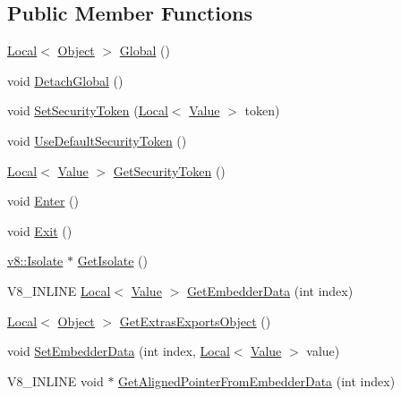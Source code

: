 \subsection*{Public Member Functions}
\begin{DoxyCompactItemize}
\item 
\hyperlink{classv8_1_1Local}{Local}$<$ \hyperlink{classv8_1_1Object}{Object} $>$ \hyperlink{classv8_1_1Context_af5cd9f97ef6a3307c1c21f80f4b743eb}{Global} ()
\item 
void \hyperlink{classv8_1_1Context_a841c7dd92eb8c57df92a268a164dea97}{Detach\+Global} ()
\item 
void \hyperlink{classv8_1_1Context_a2351d9bdf4450d5f23734033289ba3ab}{Set\+Security\+Token} (\hyperlink{classv8_1_1Local}{Local}$<$ \hyperlink{classv8_1_1Value}{Value} $>$ token)
\item 
void \hyperlink{classv8_1_1Context_aa9e1a14982b64fd51ab87600a287bad2}{Use\+Default\+Security\+Token} ()
\item 
\hyperlink{classv8_1_1Local}{Local}$<$ \hyperlink{classv8_1_1Value}{Value} $>$ \hyperlink{classv8_1_1Context_a59d7bc98684603ec4d9b1d1db2acaad8}{Get\+Security\+Token} ()
\item 
void \hyperlink{classv8_1_1Context_a6995c49d9897eb49053f07874b825133}{Enter} ()
\item 
void \hyperlink{classv8_1_1Context_a2db09d4fefb26023a40d88972a4c1599}{Exit} ()
\item 
\hyperlink{classv8_1_1Isolate}{v8\+::\+Isolate} $\ast$ \hyperlink{classv8_1_1Context_af55552d8658ecb20eff7af2c83e8ede2}{Get\+Isolate} ()
\item 
V8\+\_\+\+I\+N\+L\+I\+N\+E \hyperlink{classv8_1_1Local}{Local}$<$ \hyperlink{classv8_1_1Value}{Value} $>$ \hyperlink{classv8_1_1Context_a9cfafe0ac56f6aee17eb80a913489296}{Get\+Embedder\+Data} (int index)
\item 
\hyperlink{classv8_1_1Local}{Local}$<$ \hyperlink{classv8_1_1Object}{Object} $>$ \hyperlink{classv8_1_1Context_a2cd122a87260f80cc3e70656d5b17491}{Get\+Extras\+Exports\+Object} ()
\item 
void \hyperlink{classv8_1_1Context_a1f2f3da0b9c3d9b68a5384b757d607d2}{Set\+Embedder\+Data} (int index, \hyperlink{classv8_1_1Local}{Local}$<$ \hyperlink{classv8_1_1Value}{Value} $>$ value)
\item 
V8\+\_\+\+I\+N\+L\+I\+N\+E void $\ast$ \hyperlink{classv8_1_1Context_aa3b5c1a1a5d145c6096840898013f559}{Get\+Aligned\+Pointer\+From\+Embedder\+Data} (int index)
\item 

\end{DoxyCompactItemize}
